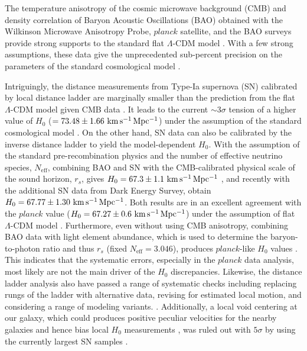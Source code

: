 \documentclass[useAMS,usenatbib]{mnras}
\def\planck{\textit{planck}}
\def\kmsmpc{\rm km\,s^{-1}\,Mpc^{-1}}
\begin{document}
The temperature anisotropy of the cosmic microwave background (CMB) and density correlation of Baryon Acoustic Oscillations (BAO) obtained with the Wilkinson Microwave Anisotropy Probe, $\planck$ satellite, and the BAO surveys provide strong supports to the standard flat $\Lambda$-CDM model \citep[e.g.,][]{KomatsuEtal11,HinshawEtal13,planck18parameter}. With a few strong assumptions, these data give the unprecedented sub-percent precision on the parameters of the standard cosmological model
 \citep[e.g.,][]{AndersonEtal14,KazinEtal14,RossEtal15}.

Intriguingly, the distance measurements from Type-Ia supernova (SN) calibrated by local distance ladder are marginally smaller than the prediction from the flat $\Lambda$-CDM model given CMB data \citep[see Fig. 4 in][]{CuestaEtal15}. 
It leads to the current $\sim 3\sigma$ tension of a higher value of $H_{0}$ ($=73.48\pm1.66~\kmsmpc$) under the assumption of the standard cosmological model \citep{RiessEtal18c}. 
On the other hand, SN data can also be calibrated by the inverse distance ladder to yield the model-dependent $H_{0}$.
With the assumption of the standard pre-recombination physics and the number of effective neutrino species, $N_{\textrm{eff}}$, combining BAO and SN with the CMB-calibrated physical scale of the sound horizon, $r_{s}$, gives $H_{0} =67.3\pm1.1~\kmsmpc$ \citep{AuborugEtal15}, and recently with the additional SN data from Dark Energy Survey, \citet{MacaulayEtal18} obtain $H_{0} =67.77\pm1.30~\kmsmpc$. Both results are in an excellent agreement with the $\planck$ value ($H_{0} = 67.27\pm0.6~\kmsmpc$) under the assumption of flat $\Lambda$-CDM model \citep{planck18parameter}. Furthermore, even without using CMB anisotropy, combining BAO data with light element abundance, which is used to determine the baryon-to-photon ratio and thus $r_{s}$ (fixed $N_{\textrm{eff}}=3.046$), produces $\planck$-like $H_{0}$ values \citep{AddisonEtal18}. This indicates that the systematic errors, especially in the $\planck$ data analysis, most likely are not the main driver of the $H_{0}$ discrepancies. 
 Likewise, the distance ladder analysis also have passed a range of systematic checks including replacing rungs of the ladder with alternative data, revising for estimated local motion, and considering a range of modeling variants.
 \citep[e.g.,][]{Efstathiou14,CardonaEtal17,ZhangEtal17,FollinKonx18,FeeneyEtal18,DhawanEtal18}. 
 Additionally, a local void centering at our galaxy, which could produces positive peculiar velocities for the nearby galaxies and hence bias local $H_{0}$ measurements \citep{KeenanEtal13,FleuryEtal17,ShanksEtal19}, was ruled out with $5\sigma$ by using the currently largest SN samples \citep{KenworthyEtal19}.
\end{document}
